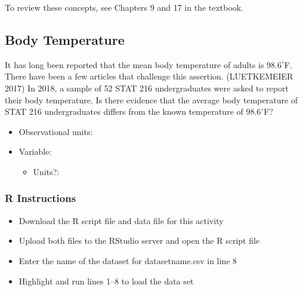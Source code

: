 \documentclass[
]{report}
\providecommand{\tightlist}{%
  \setlength{\itemsep}{0pt}\setlength{\parskip}{0pt}}
\begin{document}
To review these concepts, see Chapters 9 and 17 in the textbook.

\subsection{Body Temperature}\label{body-temperature}

It has long been reported that the mean body temperature of adults is \(98.6^{\circ}\)F. There have been a few articles that challenge this assertion. ({LUETKEMEIER} 2017) In 2018, a sample of 52 STAT 216 undergraduates were asked to report their body temperature. Is there evidence that the average body temperature of STAT 216 undergraduates differs from the known temperature of \(98.6^{\circ}\)F?

\vspace{2mm}

\begin{itemize}
\tightlist
\item
  Observational units:
\end{itemize}

\vspace{2mm}

\begin{itemize}
\item
  Variable:

  \begin{itemize}
  \tightlist
  \item
    Units?:
  \end{itemize}
\end{itemize}

\vspace{2mm}

\subsubsection*{R Instructions}\label{r-instructions-4}

\begin{itemize}
\item
  Download the R script file and data file for this activity
\item
  Upload both files to the RStudio server and open the R script file
\item
  Enter the name of the dataset for datasetname.csv in line 8
\item
  Highlight and run lines 1--8 to load the data set
\end{itemize}
\end{document}

